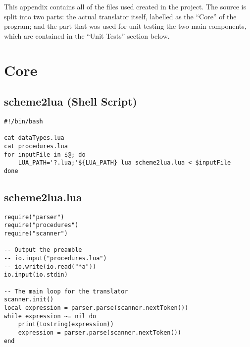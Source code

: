 \label{sec:sourcecode}
This appendix contains all of the files used created in the project. The source
is split into two parts: the actual translator itself, labelled as the ``Core''
of the program; and the part that was used for unit testing the two main
components, which are contained in the ``Unit Tests'' section below.

\section{Core}
\subsection{scheme2lua (Shell Script)}

\scriptsize

\begin{verbatim}
#!/bin/bash

cat dataTypes.lua
cat procedures.lua
for inputFile in $@; do
    LUA_PATH='?.lua;'${LUA_PATH} lua scheme2lua.lua < $inputFile
done
\end{verbatim}

\subsection{scheme2lua.lua}
\begin{verbatim}
require("parser")
require("procedures")
require("scanner")

-- Output the preamble
-- io.input("procedures.lua")
-- io.write(io.read("*a"))
io.input(io.stdin)

-- The main loop for the translator
scanner.init()
local expression = parser.parse(scanner.nextToken())
while expression ~= nil do
    print(tostring(expression))
    expression = parser.parse(scanner.nextToken())
end
\end{verbatim}

